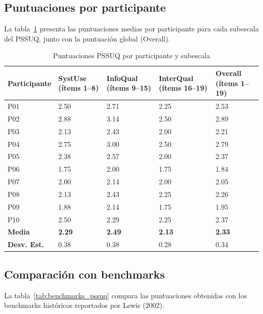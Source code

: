 \documentclass[a4paper,12pt]{report}
\begin{document}
\subsection{Puntuaciones por participante}

La tabla~\ref{tab:resultados_pssuq} presenta las puntuaciones medias por participante para cada subescala del PSSUQ, junto con la puntuación global (Overall).

\begin{table}[H]
    \centering
    \caption{Puntuaciones PSSUQ por participante y subescala}
    \label{tab:resultados_pssuq}
    \begin{tabular}{p{1.2cm} p{2.2cm} p{2.2cm} p{2.2cm} p{2.2cm}}
        \toprule
        \textbf{Participante} & \textbf{SystUse} (ítems 1--8) & \textbf{InfoQual} (ítems 9--15) & \textbf{InterQual} (ítems 16--19) & \textbf{Overall} (ítems 1--19) \\
        \midrule
        P01 & 2.50 & 2.71 & 2.25 & 2.53 \\
        P02 & 2.88 & 3.14 & 2.50 & 2.89 \\
        P03 & 2.13 & 2.43 & 2.00 & 2.21 \\
        P04 & 2.75 & 3.00 & 2.50 & 2.79 \\
        P05 & 2.38 & 2.57 & 2.00 & 2.37 \\
        P06 & 1.75 & 2.00 & 1.75 & 1.84 \\
        P07 & 2.00 & 2.14 & 2.00 & 2.05 \\
        P08 & 2.13 & 2.43 & 2.25 & 2.26 \\
        P09 & 1.88 & 2.14 & 1.75 & 1.95 \\
        P10 & 2.50 & 2.29 & 2.25 & 2.37 \\
        \midrule
        \textbf{Media} & \textbf{2.29} & \textbf{2.49} & \textbf{2.13} & \textbf{2.33} \\
        \textbf{Desv. Est.} & 0.38 & 0.38 & 0.28 & 0.34 \\
        \bottomrule
    \end{tabular}
\end{table}

\subsection{Comparación con benchmarks}

La tabla~\ref{tab:benchmarks_pssuq} compara las puntuaciones obtenidas con los benchmarks históricos reportados por Lewis (2002).
\end{document}
